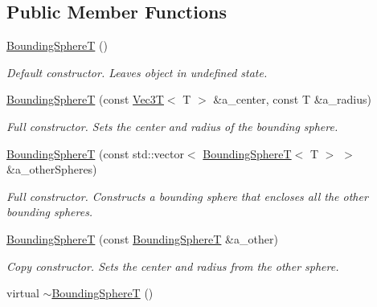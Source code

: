 \subsection*{Public Member Functions}
\begin{DoxyCompactItemize}
\item 
\mbox{\label{classBoundingVolumes_1_1BoundingSphereT_a5616a743d8b53b11533ef47b3da281aa}} 
\hyperlink{classBoundingVolumes_1_1BoundingSphereT_a5616a743d8b53b11533ef47b3da281aa}{Bounding\+SphereT} ()
\begin{DoxyCompactList}\small\item\em Default constructor. Leaves object in undefined state. \end{DoxyCompactList}\item 
\hyperlink{classBoundingVolumes_1_1BoundingSphereT_a9e81ed0ce76489225f5dbd57ed1abc8f}{Bounding\+SphereT} (const \hyperlink{classVec3T}{Vec3T}$<$ T $>$ \&a\+\_\+center, const T \&a\+\_\+radius)
\begin{DoxyCompactList}\small\item\em Full constructor. Sets the center and radius of the bounding sphere. \end{DoxyCompactList}\item 
\hyperlink{classBoundingVolumes_1_1BoundingSphereT_af9cd8b7e77ed36178073be298efd27f0}{Bounding\+SphereT} (const std\+::vector$<$ \hyperlink{classBoundingVolumes_1_1BoundingSphereT}{Bounding\+SphereT}$<$ T $>$ $>$ \&a\+\_\+other\+Spheres)
\begin{DoxyCompactList}\small\item\em Full constructor. Constructs a bounding sphere that encloses all the other bounding spheres. \end{DoxyCompactList}\item 
\hyperlink{classBoundingVolumes_1_1BoundingSphereT_afd5a1632d9ceef8a4fa3af59e562c7f8}{Bounding\+SphereT} (const \hyperlink{classBoundingVolumes_1_1BoundingSphereT}{Bounding\+SphereT} \&a\+\_\+other)
\begin{DoxyCompactList}\small\item\em Copy constructor. Sets the center and radius from the other sphere. \end{DoxyCompactList}\item 
\mbox{\label{classBoundingVolumes_1_1BoundingSphereT_a4495da5774e14f97c0e7579b37cfd60e}} 
virtual \hyperlink{classBoundingVolumes_1_1BoundingSphereT_a4495da5774e14f97c0e7579b37cfd60e}{$\sim$\+Bounding\+SphereT} ()

\end{DoxyCompactItemize}
